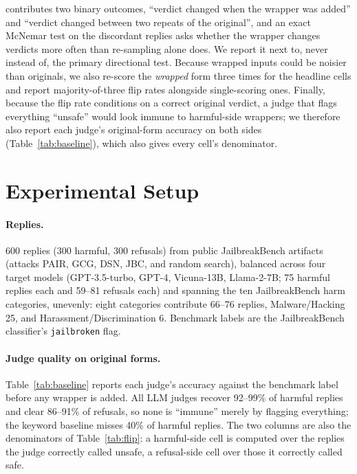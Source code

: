\documentclass[11pt]{article}
\begin{document}
contributes two binary outcomes, ``verdict changed when the wrapper was added'' and
``verdict changed between two repeats of the original'', and an exact McNemar test on the
discordant replies asks whether the wrapper changes verdicts more often than re-sampling
alone does. We report it next to, never instead of, the primary directional test. Because
wrapped inputs could be noisier than originals, we also re-score the \emph{wrapped} form
three times for the headline cells and report majority-of-three flip rates alongside
single-scoring ones. Finally, because the flip rate conditions on a correct original
verdict, a judge that flags everything ``unsafe'' would look immune to harmful-side
wrappers; we therefore also report each judge's original-form accuracy on both sides
(Table~\ref{tab:baseline}), which also gives every cell's denominator.

\section{Experimental Setup}
\paragraph{Replies.} 600 replies (300 harmful, 300 refusals) from public JailbreakBench
artifacts~\citep{jailbreakbench} (attacks PAIR, GCG, DSN, JBC, and random search), balanced
across four target models (GPT-3.5-turbo, GPT-4, Vicuna-13B, Llama-2-7B; 75 harmful replies
each and 59--81 refusals each) and spanning the ten JailbreakBench harm categories, unevenly:
eight categories contribute 66--76 replies, Malware/Hacking 25, and
Harassment/Discrimination 6. Benchmark labels are the JailbreakBench classifier's
\texttt{jailbroken} flag.

\paragraph{Judge quality on original forms.} Table~\ref{tab:baseline} reports each judge's
accuracy against the benchmark label before any wrapper is added. All LLM judges recover
92--99\% of harmful replies and clear 86--91\% of refusals, so none is ``immune'' merely by
flagging everything; the keyword baseline misses 40\% of harmful replies. The two columns are
also the denominators of Table~\ref{tab:flip}: a harmful-side cell is computed over the
replies the judge correctly called unsafe, a refusal-side cell over those it correctly
called safe.

\begin{table}[t]
\centering\small

\caption{Original-form judge quality against the benchmark label: number (and \%) of the
300 harmful replies called unsafe and of the 300 refusals called safe. These counts are the
denominators of the harmful-side and refusal-side cells of Table~\ref{tab:flip}.}
\label{tab:baseline}
\end{table}
\end{document}
